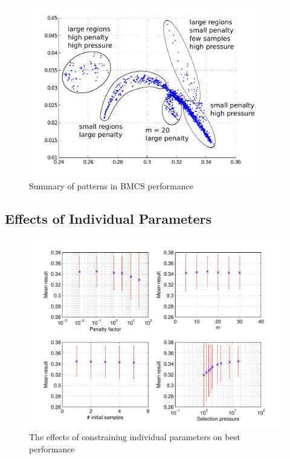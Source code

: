 \documentclass[10pt]{article}
\begin{document}
\begin{itemize}
\begin{figure}[tbp]
  \begin{center}
    \includegraphics[width=10cm]{bmcs_perf_summary.pdf}
    \end{center}
    \caption{Summary of patterns in BMCS performance}
    \label{fig:bmcs_perf_summary}
    \end{figure}

\end{itemize}

\subsection{Effects of Individual Parameters}

\begin{figure}[tbp]
  \begin{center}
    \includegraphics[width=15cm]{bmcs_plots.pdf}
    \end{center}
    \caption{The effects of constraining individual parameters on best
    performance}
    \label{fig:bmcs_plots}
    \end{figure}
\end{document}
